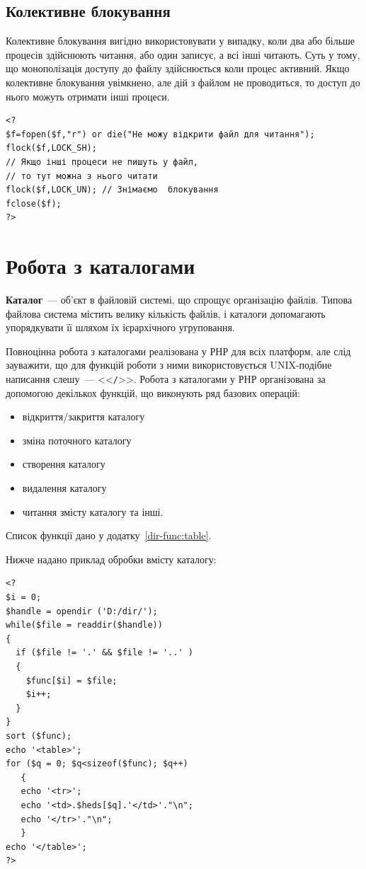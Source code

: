 \subsection*{Колективне блокування}
Колективне блокування вигідно використовувати у випадку, коли два або більше процесів здійснюють читання, або один записує, а всі інші читають. Суть у тому, що монополізація доступу до файлу здійснюється коли процес активний. Якщо колективне блокування увімкнено, але дій з файлом не проводиться, то доступ до нього можуть отримати інші процеси.



\begin{lstlisting}[caption=Колективне блокування файлу]
<?
$f=fopen($f,"r") or die("Не можу відкрити файл для читання");
flock($f,LOCK_SH); 
// Якщо інші процеси не пишуть у файл,
// то тут можна з нього читати
flock($f,LOCK_UN); // Знімаємо	блокування
fclose($f);
?>
\end{lstlisting}

\section{Робота з каталогами}
\textbf{Каталог}~--- об'єкт в файловій системі, що спрощує організацію файлів. Типова файлова система містить велику кількість файлів, і каталоги допомагають упорядкувати її шляхом їх ієрархічного угруповання.

Повноцінна робота з каталогами реалізована у РНР для всіх платформ, але слід зауважити, що для функцій роботи з ними використовується UNIX-подібне написання слешу~--- <<\verb'/'>>. Робота з каталогами у РНР організована за допомогою декількох функцій, що виконують ряд базових операцій:
\begin{itemize}
\item відкриття/закриття каталогу
\item зміна поточного каталогу
\item створення каталогу
\item видалення каталогу
\item читання змісту каталогу та інші.

\end{itemize}
Список функції дано у додатку~\ref{dir-func:table}.

Нижче надано приклад обробки вмісту каталогу:

\begin{lstlisting}[caption=Обробка вмісту каталогу]
<?
$i = 0;
$handle = opendir ('D:/dir/');
while($file = readdir($handle))
{
  if ($file != '.' && $file != '..' )
  {
    $func[$i] = $file;
    $i++;
  }
}
sort ($func);
echo '<table>';
for ($q = 0; $q<sizeof($func); $q++)
   {
   echo '<tr>';
   echo '<td>.$heds[$q].'</td>'."\n";
   echo '</tr>'."\n";
   }
echo '</table>';
?>
\end{lstlisting}

